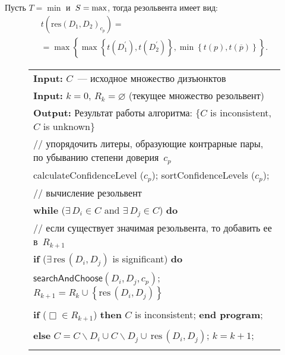 \begin{multicols}{2}
  Пусть $T=\min$ и~$S\hm=\max$, тогда резольвента имеет вид:
  \begin{multline*}
  t\left( \mathrm{res}\left(D_1, D_2\right)_{c_p}\right) ={}\\
  {}= \max \left\{ \max \left\{ t(D_1^\prime), 
t(D_2^\prime)\right\}, \min \left\{ t(p), t(\overline{p})\right\}\right\}.
\end{multline*}

\begin{figure*}[b] %
\begin{center}
{\small \begin{tabular}{|p{118mm}|}
  \hline
   \textbf{Input:} $C$~--- исходное множество дизъюнктов\\
   \textbf{Input:} $k=0$, $R_k=\varnothing$ (текущее множество резольвент)\\
   \textbf{Output:} Результат работы алгоритма: $\{$$C$ is inconsistent, $C$ is 
unknown$\}$\\
{\footnotesize // упорядочить литеры, образующие контрарные пары, по убыванию степени 
доверия~$c_p$}\\
  {\sf calculateConfidenceLevel} ($c_p$); {\sf sortConfidenceLevels} ($c_p$);\\
  {\footnotesize // вычисление резольвент}\\
  \textbf{while} ($\exists\,D_i\in C$ and $\exists\,D_j\in C$) \textbf{do}\\
  {\footnotesize // если существует значимая резольвента, то добавить ее в~$R_{k+1}$}\\
        \hspace*{5mm}\textbf{if} ($\exists\,\mathrm{res}\,(D_i, D_j)$ is significant) \textbf{do}\\
        \hspace*{5mm}$\mathsf{searchAndChoose} (D_i, D_j, c_p)$; $R_{k+1}=R_k\cup 
\left\{ \mathrm{res}\,(D_i, D_j)\right\}$\\
        \hspace*{5mm}{\footnotesize // проверка: существует ли в~$R_{k+1}$ пустой 
дизъюнкт~$\Box$}\\
        \hspace*{5mm}\textbf{if} ($\Box\in R_{k+1}$) \textbf{then} $C$ is inconsistent;  
\textbf{end program};\\
        \hspace*{5mm}{\footnotesize // если в~$R_{k+1}$ нет $\Box$, то изменить множество~$C$}\\
        \hspace*{5mm}\textbf{else} $C=C\backslash D_i\cup C\backslash D_j \cup\,\mathrm{res}\,(D_i,D_j)$; $k=k+1$;\\
$$
\end{tabular}}
\end{center}
\end{figure*}
\end{multicols}
